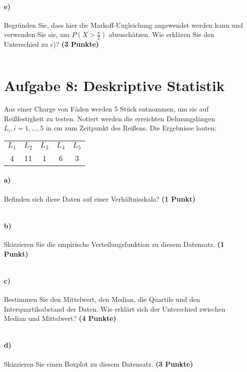 \documentclass[10pt, a4paper]{article}
\begin{document}
\paragraph{e)} Begründen Sie, dass hier die Markoff-Ungleichung angewendet werden kann und verwenden Sie sie, um $P(X >\frac{\pi}{2})$ abzuschätzen. Wie erklären Sie den Unterschied zu c)? \textbf{(3 Punkte)}\\
\begin{tabular}{| p{17cm} |}
    \hline
    \\\hline
\end{tabular}

\section{Aufgabe 8: Deskriptive Statistik}
Aus einer Charge von Fäden werden 5 Stück entnommen, um sie auf Reißfestigkeit zu testen. Notiert werden die erreichten Dehnungslängen $L_i,i= 1,...,5$ in cm zum Zeitpunkt des Reißens. Die Ergebnisse lauten:
\begin{tabular}{c | c | c | c | c}
    $L_1$ & $L_2$ & $L_3$ & $L_4$ & $L_5$ \\
    4     & 11    & 1     & 6     & 3
\end{tabular}

\paragraph{a)} Befinden sich diese Daten auf einer Verhältnisskala? \textbf{(1 Punkt)}\\
\begin{tabular}{| p{17cm} |}
    \hline
    \\\hline
\end{tabular}

\paragraph{b)} Skizzieren Sie die empirische Verteilungsfunktion zu diesem Datensatz. \textbf{(1 Punkt)}\\
\begin{tabular}{| p{17cm} |}
    \hline
    \\\hline
\end{tabular}

\paragraph{c)} Bestimmen Sie den Mittelwert, den Median, die Quartile und den Interquartilsabstand der Daten. Wie erklärt sich der Unterschied zwischen Median und Mittelwert? \textbf{(4 Punkte)}\\
\begin{tabular}{| p{17cm} |}
    \hline
    \\\hline
\end{tabular}

\paragraph{d)} Skizzieren Sie einen Boxplot zu diesem Datensatz. \textbf{(3 Punkte)}\\
\begin{tabular}{| p{17cm} |}
    \hline
    \\\hline
\end{tabular}
\end{document}
